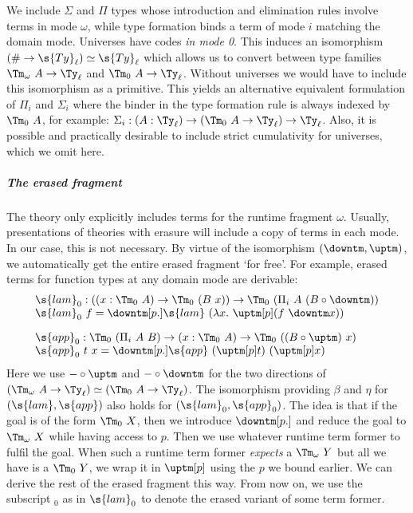 \documentclass[a4paper,UKenglish,cleveref,autoref,thm-restate]{lipics-v2021}
\begin{document}
We include $\Sigma$ and $\Pi$ types whose introduction and elimination rules
involve terms in mode $\omega$, while type formation binds a term of mode $i$
matching the domain mode. Universes have codes \emph{in mode 0}. This induces an
isomorphism $(\# \to \s{Ty}_\ell) \simeq \s{Ty}_\ell$ which allows us to convert
between type families $\Tm_\omega\ A \to \Ty_\ell$ and $\Tm_0\ A \to \Ty_\ell$.
Without universes we would have to include this isomorphism as a primitive. This
yields an alternative equivalent formulation of $\Pi_i$ and $\Sigma_i$ 
where the binder in the type formation rule is always indexed by $\Tm_0\ A$, for
example: $\Sigma_i : (A : \Ty_\ell) \to (\Tm_0\ A \to \Ty_\ell) \to \Ty_\ell$.
Also, it is possible and practically desirable to include strict cumulativity
\cite{Sterling2019-ze} for universes, which we omit here.

\subparagraph{The erased fragment}\label{ssub:erased}


The theory only explicitly includes terms for the runtime fragment
$\omega$. Usually, presentations of theories with erasure will include
a copy of terms in each mode. In our case, this is not necessary. By virtue
of the isomorphism $(\downtm, \uptm)$, we automatically get the entire erased
fragment `for free'.
For example, erased terms for function types at any domain mode are derivable:
\[
\begin{array}{l}
  \s{lam}_0 : ((x : \Tm_0\ A) \to \Tm_0\ (B\ x)) \to \Tm_0\ (\Pi_i\ A\ (B \circ \downtm)) \\
  \s{lam}_0\ f = {\downtm[p.] \s{lam}\ (\lambda x.\ \uptm[p] (f\ \downtm x))} \\[1em]
  \s{app}_0 : \Tm_0\ (\Pi_i\ A\ B) \to (x : \Tm_0\ A) \to \Tm_0\ ((B \circ \uptm)\ x)  \\
  \s{app}_0\ t\ x = {\downtm[p.] \s{app}\ (\uptm[p] t)\ (\uptm[p] x)}
\end{array}\]
Here we use $- \circ \uptm$ and $- \circ \downtm$ for the two directions
of $(\Tm_\omega\ A \to \Ty_\ell) \simeq (\Tm_0\ A \to \Ty_\ell)$.
The isomorphism providing $\beta$ and $\eta$ for $(\s{lam},
\s{app})$ also holds for $(\s{lam}_0, \s{app}_0)$. The idea is that if the goal
is of the form $\Tm_0\ X$, then we introduce $\downtm[p.]$ and reduce the goal
to $\Tm_\omega\ X$ while having access to $p$. Then we use whatever runtime term
former to fulfil the goal. When such a runtime term former \emph{expects} a
$\Tm_\omega\ Y$  but all we have is a $\Tm_0\ Y$, we wrap it in $\uptm[p]$ using
the $p$ we bound earlier. We can derive the rest of the erased fragment this
way. From now on, we use the subscript $_0$ as in $\s{lam}_0$ to denote the
erased variant of some term former.
\end{document}
